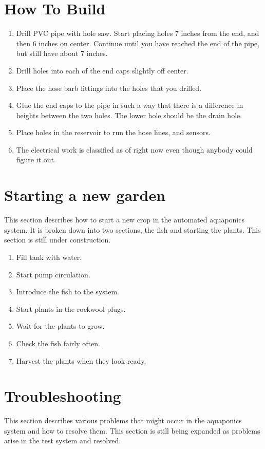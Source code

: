 \documentclass[american,12pt]{article}
\begin{document}
\section{How To Build}
\begin{enumerate}
    \item Drill PVC pipe with hole saw. Start placing holes 7 inches from the
        end, and then 6 inches on center. Continue until you have reached
        the end of the pipe, but still have about 7 inches.
    \item Drill holes into each of the end caps slightly off center.
    \item Place the hose barb fittings into the holes that you drilled.
    \item Glue the end caps to the pipe in such a way that there is a difference
   	      in heights between the two holes. The lower hole should be the drain
   	      hole.
   	\item Place holes in the reservoir to run the hose lines, and sensors.
   	\item The electrical work is classified as of right now even though anybody
   	      could figure it out.
\end{enumerate}


\section{Starting a new garden}
This section describes how to start a new crop in the automated aquaponics
system. It is broken down into two sections, the fish and starting the plants.
This section is still under construction.

\begin{enumerate}
    \item Fill tank with water.
    \item Start pump circulation.
    \item Introduce the fish to the system.
    \item Start plants in the rockwool plugs.
    \item Wait for the plants to grow.
    \item Check the fish fairly often.
    \item Harvest the plants when they look ready.
\end{enumerate}

\section{Troubleshooting}
This section describes various problems that might occur in the 
aquaponics system and how to resolve them. This section is still
being expanded as problems arise in the test system and
resolved.
\end{document}
